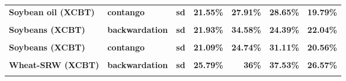 \documentclass[
  authoryear,
  preprint,
  3p]{elsarticle}
\begin{document}
\begin{longtable}[t]{>{}l>{}l>{}l>{}r>{}r>{}r>{}r}
\addlinespace
\textbf{Soybean oil (XCBT)} & \textbf{contango} & \textbf{sd} & \textcolor[HTML]{4285f4}{\textbf{21.55\%}} & \textcolor[HTML]{4285f4}{\textbf{27.91\%}} & \textcolor[HTML]{4285f4}{\textbf{28.65\%}} & \textcolor[HTML]{4285f4}{\textbf{19.79\%}}\\
\textbf{\cellcolor{gray!10}{Soybeans (XCBT)}} & \textbf{\cellcolor{gray!10}{backwardation}} & \textbf{\cellcolor{gray!10}{mean}} & \textcolor[HTML]{4285f4}{\textbf{\cellcolor{gray!10}{13.69\%}}} & \textcolor[HTML]{4285f4}{\textbf{\cellcolor{gray!10}{0.93\%}}} & \textcolor[HTML]{4285f4}{\textbf{\cellcolor{gray!10}{13.42\%}}} & \textcolor[HTML]{4285f4}{\textbf{\cellcolor{gray!10}{-11.45\%}}}\\
\textbf{Soybeans (XCBT)} & \textbf{backwardation} & \textbf{sd} & \textcolor[HTML]{4285f4}{\textbf{21.93\%}} & \textcolor[HTML]{4285f4}{\textbf{34.58\%}} & \textcolor[HTML]{4285f4}{\textbf{24.39\%}} & \textcolor[HTML]{4285f4}{\textbf{22.04\%}}\\
\textbf{\cellcolor{gray!10}{Soybeans (XCBT)}} & \textbf{\cellcolor{gray!10}{contango}} & \textbf{\cellcolor{gray!10}{mean}} & \textcolor[HTML]{4285f4}{\textbf{\cellcolor{gray!10}{-0.16\%}}} & \textcolor[HTML]{4285f4}{\textbf{\cellcolor{gray!10}{25.71\%}}} & \textcolor[HTML]{4285f4}{\textbf{\cellcolor{gray!10}{0.96\%}}} & \textcolor[HTML]{4285f4}{\textbf{\cellcolor{gray!10}{3.75\%}}}\\
\textbf{Soybeans (XCBT)} & \textbf{contango} & \textbf{sd} & \textcolor[HTML]{4285f4}{\textbf{21.09\%}} & \textcolor[HTML]{4285f4}{\textbf{24.74\%}} & \textcolor[HTML]{4285f4}{\textbf{31.11\%}} & \textcolor[HTML]{4285f4}{\textbf{20.56\%}}\\
\addlinespace
\textbf{\cellcolor{gray!10}{Wheat-SRW (XCBT)}} & \textbf{\cellcolor{gray!10}{backwardation}} & \textbf{\cellcolor{gray!10}{mean}} & \textcolor[HTML]{4285f4}{\textbf{\cellcolor{gray!10}{-2.7\%}}} & \textcolor[HTML]{4285f4}{\textbf{\cellcolor{gray!10}{19.02\%}}} & \textcolor[HTML]{4285f4}{\textbf{\cellcolor{gray!10}{0.98\%}}} & \textcolor[HTML]{4285f4}{\textbf{\cellcolor{gray!10}{0.44\%}}}\\
\textbf{Wheat-SRW (XCBT)} & \textbf{backwardation} & \textbf{sd} & \textcolor[HTML]{4285f4}{\textbf{25.79\%}} & \textcolor[HTML]{4285f4}{\textbf{36\%}} & \textcolor[HTML]{4285f4}{\textbf{37.53\%}} & \textcolor[HTML]{4285f4}{\textbf{26.57\%}}\\
\textbf{\cellcolor{gray!10}{Wheat-SRW (XCBT)}} & \textbf{\cellcolor{gray!10}{contango}} & \textbf{\cellcolor{gray!10}{mean}} & \textcolor[HTML]{4285f4}{\textbf{\cellcolor{gray!10}{11.78\%}}} & \textcolor[HTML]{4285f4}{\textbf{\cellcolor{gray!10}{16.29\%}}} & \textcolor[HTML]{4285f4}{\textbf{\cellcolor{gray!10}{14.57\%}}} & \textcolor[HTML]{4285f4}{\textbf{\cellcolor{gray!10}{-2.77\%}}}\\

\end{longtable}
\end{document}
